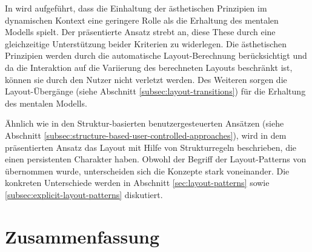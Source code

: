 In \cite[S.5]{Maier12A-Pattern-based} wird aufgeführt, dass die Einhaltung der ästhetischen Prinzipien im dynamischen Kontext eine geringere Rolle als die Erhaltung des mentalen Modells spielt. Der präsentierte Ansatz strebt an, diese These durch eine gleichzeitige Unterstützung beider Kriterien zu widerlegen. Die ästhetischen Prinzipien werden durch die automatische Layout-Berechnung berücksichtigt und da die Interaktion auf die Variierung des berechneten Layouts beschränkt ist, können sie durch den Nutzer nicht verletzt werden. Des Weiteren sorgen die Layout-Übergänge (siehe Abschnitt \ref{subsec:layout-transitions}) für die Erhaltung des mentalen Modells.

Ähnlich wie in den Struktur-basierten benutzergesteuerten Ansätzen (siehe Abschnitt \ref{subsec:structure-based-user-controlled-approaches}), wird in dem präsentierten Ansatz das Layout mit Hilfe von Strukturregeln beschrieben, die einen persistenten Charakter haben. Obwohl der Begriff der Layout-Patterns von \cite{Maier12A-Pattern-based} übernommen wurde, unterscheiden sich die Konzepte stark voneinander. Die konkreten Unterschiede werden in Abschnitt \ref{sec:layout-patterns} sowie \ref{subsec:explicit-layout-patterns} diskutiert.


\section{Zusammenfassung}
\label{sec:approach-summary}






